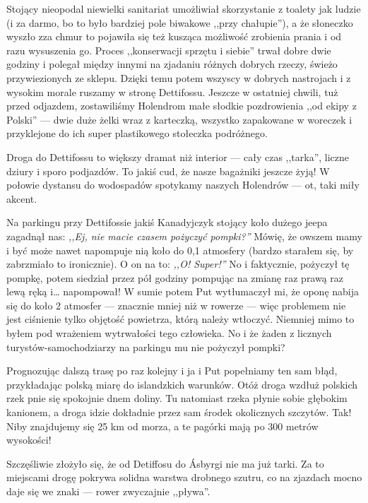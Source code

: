 Stojący nieopodal niewielki sanitariat umożliwiał skorzystanie z toalety jak ludzie (i za darmo, bo to było bardziej pole biwakowe ,,przy chałupie''), a że słoneczko wyszło zza chmur to pojawiła się też kusząca możliwość zrobienia prania i od razu wysuszenia go. Proces ,,konserwacji sprzętu i siebie'' trwał dobre dwie godziny i polegał między innymi na zjadaniu różnych dobrych rzeczy, świeżo przywiezionych ze sklepu. Dzięki temu potem wszyscy w dobrych nastrojach i z wysokim morale ruszamy w stronę Dettifossu. Jeszcze w ostatniej chwili, tuż przed odjazdem, zostawiliśmy Holendrom małe słodkie pozdrowienia ,,od ekipy z Polski'' --- dwie duże żelki wraz z karteczką, wszystko zapakowane w woreczek i przyklejone do ich super plastikowego stołeczka podróżnego.

Droga do Dettifossu to większy dramat niż interior --- cały czas ,,tarka'', liczne dziury i sporo podjazdów. To jakiś cud, że nasze bagażniki jeszcze żyją! W połowie dystansu do wodospadów spotykamy naszych Holendrów --- ot, taki miły akcent.


Na parkingu przy Dettifossie jakiś Kanadyjczyk stojący koło dużego jeepa zagadnął nas: \emph{,,Ej, nie macie czasem pożyczyć pompki?''} Mówię, że owszem mamy i być może nawet napompuje nią koło do 0,1 atmosfery (bardzo starałem się, by zabrzmiało to ironicznie). O on na to: \emph{,,O! Super!''} No i faktycznie, pożyczył tę pompkę, potem siedział przez pół godziny pompując na zmianę raz prawą raz lewą ręką i… napompował! W sumie potem Put wytłumaczył mi, że oponę nabija się do koło 2 atmosfer --- znacznie mniej niż w rowerze --- więc problemem nie jest ciśnienie tylko objętość powietrza, którą należy wtłoczyć. Niemniej mimo to byłem pod wrażeniem wytrwałości tego człowieka. No i że żaden z licznych turystów-samochodziarzy na parkingu mu nie pożyczył pompki?

Prognozując dalszą trasę po raz kolejny i ja i Put popełniamy ten sam błąd, przykładając polską miarę do islandzkich warunków. Otóż droga wzdłuż polskich rzek pnie się spokojnie dnem doliny. Tu natomiast rzeka płynie sobie głębokim kanionem, a droga idzie dokładnie przez sam środek okolicznych szczytów. Tak! Niby znajdujemy się 25 km od morza, a te pagórki mają po 300 metrów wysokości!

Szczęśliwie złożyło się, że od Detiffosu do Ásbyrgi nie ma już tarki. Za to miejscami drogę pokrywa solidna warstwa drobnego szutru, co na zjazdach mocno daje się we znaki --- rower zwyczajnie ,,pływa''.

